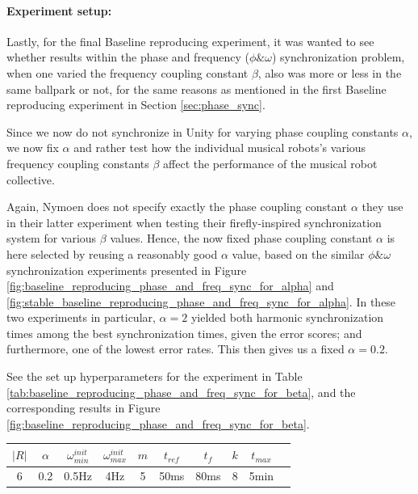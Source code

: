 		\paragraph{Experiment setup:\nl}
		
		Lastly, for the final Baseline reproducing experiment, it was wanted to see whether results within the phase and frequency ($\phi\&\omega$) synchronization problem, when one varied the frequency coupling constant $\beta$, also was more or less in the same ballpark or not, for the same reasons as mentioned in the first Baseline reproducing experiment in Section \ref{sec:phase_sync}.
		
		Since we now do not synchronize in Unity for varying phase coupling constants $\alpha$, we now fix $\alpha$ and rather test how the individual musical robots's various frequency coupling constants $\beta$ affect the performance of the musical robot collective.
		
		Again, Nymoen does not specify exactly the phase coupling constant $\alpha$ they use in their latter experiment when testing their firefly-inspired synchronization system for various $\beta$ values. Hence, the now fixed phase coupling constant $\alpha$ is here selected by reusing a reasonably good $\alpha$ value, based on the similar $\phi\&\omega$ synchronization experiments presented in Figure \ref{fig:baseline_reproducing_phase_and_freq_sync_for_alpha} and \ref{fig:stable_baseline_reproducing_phase_and_freq_sync_for_alpha}. In these two experiments in particular, $\alpha=2$ yielded both harmonic synchronization times among the best synchronization times, given the error scores; and furthermore, one of the lowest error rates. This then gives us a fixed $\alpha = 0.2$.
		
		See the set up hyperparameters for the experiment in Table \ref{tab:baseline_reproducing_phase_and_freq_sync_for_beta}, and the corresponding results in Figure \ref{fig:baseline_reproducing_phase_and_freq_sync_for_beta}.
		
		\begin{center}
		\begin{tabular}{ |c|c|c|c|c|c|c|c|c|c| } 
		\hline
		$|R|$ & $\alpha$ & $\omega_{min}^{init}$ & $\omega_{max}^{init}$ & $m$ & $t_{ref}$ & $t_f$ & $k$ & $t_{max}$ \\
		\hline
		6 & 0.2 & 0.5Hz & 4Hz & 5 & 50ms & 80ms & 8 & 5min \\
		\hline
		\end{tabular}
		\label{tab:baseline_reproducing_phase_and_freq_sync_for_beta}
		\end{center}
		
